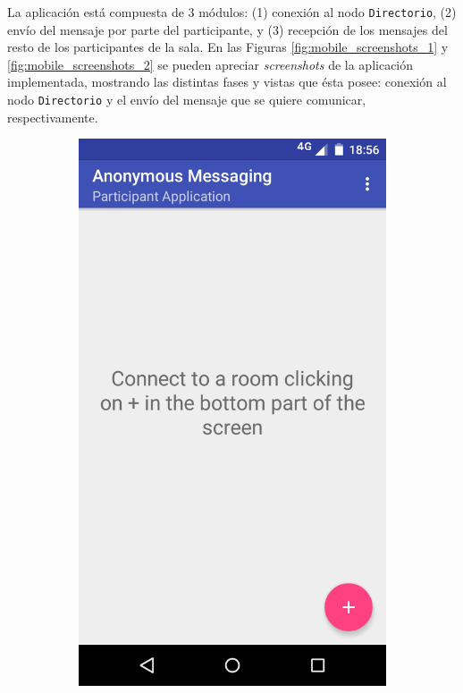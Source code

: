 La aplicación está compuesta de 3 módulos: (1) conexión al nodo 
\texttt{Directorio}, (2) envío del mensaje por parte del participante, y (3) 
recepción de los mensajes del resto de los participantes de la sala. En las 
Figuras \ref{fig:mobile_screenshots_1} y \ref{fig:mobile_screenshots_2} se 
pueden apreciar \emph{screenshots} de la aplicación implementada, mostrando 
las distintas fases y vistas que ésta posee: conexión al nodo \texttt{Directorio} y 
el envío del mensaje que se quiere comunicar, respectivamente.

\begin{figure}[H]
    \centering
    \begin{subfigure}[b]{0.4\textwidth}
        \includegraphics[width=\textwidth]{imagenes/mobile_first.png}

\end{subfigure}
\end{figure}
